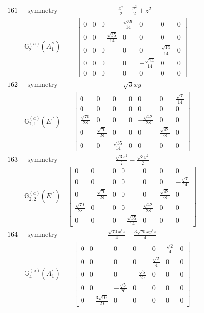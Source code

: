 \documentclass[fleqn,8pt,landscape]{jsarticle}
\begin{document}
\begin{longtable}{ccc}
$ 161 $ & $ \text{symmetry} $ & $ - \frac{x^{2}}{2} - \frac{y^{2}}{2} + z^{2} $ \\
$  $ & $ \mathbb{G}_{2}^{(a)}(A_{1}^{\prime\prime}) $ & $ \begin{bmatrix} 0 & 0 & 0 & \frac{\sqrt{35}}{14} & 0 & 0 & 0 \\ 0 & 0 & - \frac{\sqrt{35}}{14} & 0 & 0 & 0 & 0 \\ 0 & 0 & 0 & 0 & 0 & \frac{\sqrt{14}}{14} & 0 \\ 0 & 0 & 0 & 0 & - \frac{\sqrt{14}}{14} & 0 & 0 \\ 0 & 0 & 0 & 0 & 0 & 0 & 0 \end{bmatrix} $ \\ \hline
$ 162 $ & $ \text{symmetry} $ & $ \sqrt{3} x y $ \\
$  $ & $ \mathbb{G}_{2,1}^{(a)}(E^{\prime\prime}) $ & $ \begin{bmatrix} 0 & 0 & 0 & 0 & 0 & 0 & \frac{\sqrt{7}}{14} \\ 0 & 0 & 0 & 0 & 0 & 0 & 0 \\ \frac{\sqrt{70}}{28} & 0 & 0 & 0 & - \frac{\sqrt{42}}{28} & 0 & 0 \\ 0 & \frac{\sqrt{70}}{28} & 0 & 0 & 0 & \frac{\sqrt{42}}{28} & 0 \\ 0 & 0 & \frac{\sqrt{35}}{14} & 0 & 0 & 0 & 0 \end{bmatrix} $ \\ \hline
$ 163 $ & $ \text{symmetry} $ & $ \frac{\sqrt{3} x^{2}}{2} - \frac{\sqrt{3} y^{2}}{2} $ \\
$  $ & $ \mathbb{G}_{2,2}^{(a)}(E^{\prime\prime}) $ & $ \begin{bmatrix} 0 & 0 & 0 & 0 & 0 & 0 & 0 \\ 0 & 0 & 0 & 0 & 0 & 0 & - \frac{\sqrt{7}}{14} \\ 0 & - \frac{\sqrt{70}}{28} & 0 & 0 & 0 & \frac{\sqrt{42}}{28} & 0 \\ \frac{\sqrt{70}}{28} & 0 & 0 & 0 & \frac{\sqrt{42}}{28} & 0 & 0 \\ 0 & 0 & 0 & - \frac{\sqrt{35}}{14} & 0 & 0 & 0 \end{bmatrix} $ \\ \hline
$ 164 $ & $ \text{symmetry} $ & $ \frac{\sqrt{70} x^{3} z}{4} - \frac{3 \sqrt{70} x y^{2} z}{4} $ \\
$  $ & $ \mathbb{G}_{4}^{(a)}(A_{1}^{\prime}) $ & $ \begin{bmatrix} 0 & 0 & 0 & 0 & 0 & \frac{\sqrt{2}}{4} & 0 \\ 0 & 0 & 0 & 0 & \frac{\sqrt{2}}{4} & 0 & 0 \\ 0 & 0 & 0 & - \frac{\sqrt{5}}{20} & 0 & 0 & 0 \\ 0 & 0 & - \frac{\sqrt{5}}{20} & 0 & 0 & 0 & 0 \\ 0 & - \frac{3 \sqrt{10}}{20} & 0 & 0 & 0 & 0 & 0 \end{bmatrix} $ \\ \hline

\end{longtable}
\end{document}
